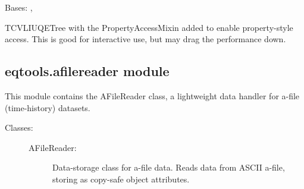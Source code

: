 \documentclass[letterpaper,10pt,english]{sphinxmanual}
\begin{document}

\begin{fulllineitems}
\label{\detokenize{eqtools:eqtools.TCVLIUQE.TCVLIUQETreeProp}}
Bases: {\hyperref[\detokenize{eqtools:eqtools.TCVLIUQE.TCVLIUQETree}]{}}, {\hyperref[\detokenize{eqtools:eqtools.core.PropertyAccessMixin}]{}}

TCVLIUQETree with the PropertyAccessMixin added to enable property-style
access. This is good for interactive use, but may drag the performance down.

\end{fulllineitems}



\subsection{eqtools.afilereader module}
\label{\detokenize{eqtools:module-eqtools.afilereader}}\label{\detokenize{eqtools:eqtools-afilereader-module}}
This module contains the AFileReader class, a lightweight data
handler for a-file (time-history) datasets.
\begin{description}
\item[{Classes:}] \leavevmode\begin{description}
\item[{AFileReader:}] \leavevmode
Data-storage class for a-file data.  Reads
data from ASCII a-file, storing as copy-safe object
attributes.

\end{description}

\end{description}
\end{document}
